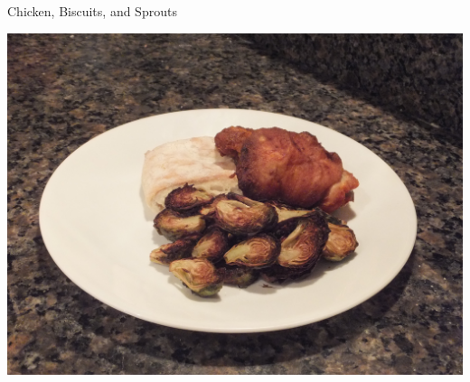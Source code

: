 \documentclass{recipe}
\begin{document}
\begin{recipe}{Chicken, Biscuits, and Sprouts}

  \begin{ingredients}
    \ingredientsep
    \ingredientsep
  \end{ingredients}

  \begin{images}
    \begin{image}
      \includegraphics[width=\linewidth]{oven_fried_chicken-01.jpeg}
    \end{image}
  \end{images}


\end{recipe}
\end{document}
